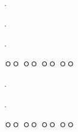                     {
\begin{problembox}{\thechapter. \ProblemNumberumber}


\end{problembox}

\begin{problembox}{\thechapter. \ProblemNumberumber}


\end{problembox}

\begin{solbox}{\thechapter. \ProblemNumberumber}
\bnset
{}


\bn \zzz

\bnset
{}
\bn \zzz

\bnset
{}
\bn \zzz

 ㅇㅇ \zzz
{} ㅇㅇ \zzz
{} ㅇㅇ \zzz
{} ㅇㅇ
\end{solbox}
\clearpage}






                   {
\begin{questionbox}{\thechapter. \QuestionNumberumber}

\end{questionbox}

\begin{solbox}{\thechapter. \QuestionNumberumber}
\bnset
{}


\bn \zzz

\bnset
{}
\bn \zzz

\bnset
{}
\bn \zzz

 ㅇㅇ \zzz
{} ㅇㅇ \zzz
{} ㅇㅇ \zzz
{} ㅇㅇ
\end{solbox}
\clearpage}
